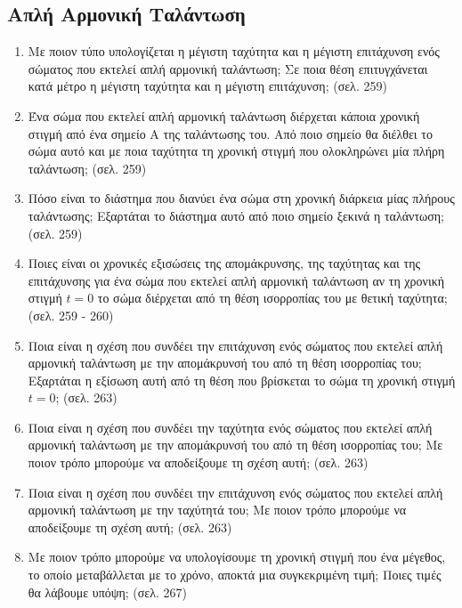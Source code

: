 \documentclass{article}
\begin{document}
\subsection{Απλή Αρμονική Ταλάντωση}

\begin{enumerate}
      \item Με ποιον τύπο υπολογίζεται η μέγιστη ταχύτητα και η μέγιστη επιτάχυνση ενός σώματος που εκτελεί απλή αρμονική ταλάντωση; Σε ποια θέση επιτυγχάνεται κατά μέτρο η μέγιστη ταχύτητα και η μέγιστη επιτάχυνση; (σελ. 259)

      \item Ένα σώμα που εκτελεί απλή αρμονική ταλάντωση διέρχεται κάποια χρονική στιγμή από ένα σημείο Α της ταλάντωσης του. Από ποιο σημείο θα διέλθει το σώμα αυτό και με ποια ταχύτητα τη χρονική στιγμή που ολοκληρώνει μία πλήρη ταλάντωση; (σελ. 259)

      \item Πόσο είναι το διάστημα που διανύει ένα σώμα στη χρονική διάρκεια μίας πλήρους ταλάντωσης; Εξαρτάται το διάστημα αυτό από ποιο σημείο ξεκινά η ταλάντωση; (σελ. 259)

      \item Ποιες είναι οι χρονικές εξισώσεις της απομάκρυνσης, της ταχύτητας και της επιτάχυνσης για ένα σώμα που εκτελεί απλή αρμονική ταλάντωση αν τη χρονική στιγμή $t = 0$ το σώμα διέρχεται από τη θέση ισορροπίας του με θετική ταχύτητα; (σελ. 259 - 260)

      \item Ποια είναι η σχέση που συνδέει την επιτάχυνση ενός σώματος που εκτελεί απλή αρμονική ταλάντωση με την απομάκρυνσή του από τη θέση ισορροπίας του; Εξαρτάται η εξίσωση αυτή από τη θέση που βρίσκεται το σώμα τη χρονική στιγμή $t = 0$; (σελ. 263)

      \item Ποια είναι η σχέση που συνδέει την ταχύτητα ενός σώματος που εκτελεί απλή αρμονική ταλάντωση με την απομάκρυνσή του από τη θέση ισορροπίας του; Με ποιον τρόπο μπορούμε να αποδείξουμε τη σχέση αυτή; (σελ. 263)

      \item Ποια είναι η σχέση που συνδέει την επιτάχυνση ενός σώματος που εκτελεί απλή αρμονική ταλάντωση με την ταχύτητά του; Με ποιον τρόπο μπορούμε να αποδείξουμε τη σχέση αυτή; (σελ. 263)

      \item Με ποιον τρόπο μπορούμε να υπολογίσουμε τη χρονική στιγμή που ένα μέγεθος, το οποίο μεταβάλλεται με το χρόνο, αποκτά μια συγκεκριμένη τιμή; Ποιες τιμές θα λάβουμε υπόψη; (σελ. 267)


\end{enumerate}
\end{document}

